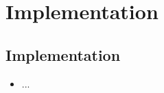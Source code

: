 \chapter{Implementation}

\section{Implementation}
    \begin{itemize}
        \item ...
    \end{itemize}

